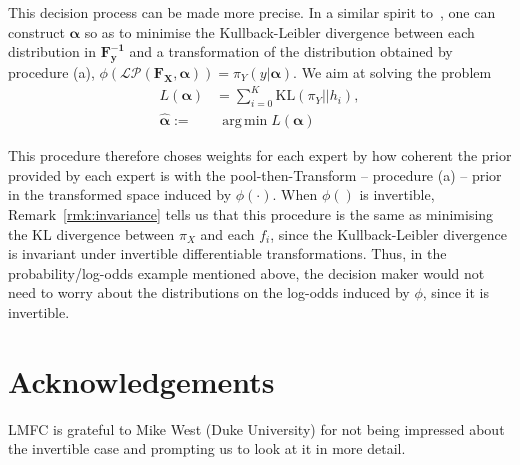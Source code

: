 \documentclass[a4paper, notitlepage, 10pt]{article}
\DeclareMathOperator*{\argmin}{arg\,min}
\begin{document}
This decision process can be made more precise.
In a similar spirit to~\cite{Carvalho2019}, one can construct $\boldsymbol\alpha$ so as to minimise the Kullback-Leibler divergence between each distribution in $\mathbf{F^{-1}_y}$ and a transformation of the distribution obtained by procedure (a), $ \phi(\mathcal{LP}(\mathbf{F_X}, \boldsymbol\alpha)) = \pi_{Y}(y | \boldsymbol\alpha)$.
We aim at solving the problem
\begin{align}
L(\boldsymbol\alpha) &= \sum_{i=0}^K \text{KL}(  \pi_{Y} || h_i), \\
     \hat{\boldsymbol\alpha}:=& \:\argmin L(\boldsymbol\alpha)  \nonumber
\end{align}

This procedure therefore choses weights for each expert by how coherent the prior provided by each expert is with the pool-then-Transform -- procedure (a) -- prior in the transformed space induced by $\phi(\cdot)$.
When $\phi()$ is invertible, Remark~\ref{rmk:invariance} tells us that this procedure is the same as minimising the KL divergence between $\pi_X$ and each $f_i$, since the Kullback-Leibler divergence is invariant under invertible differentiable transformations.
Thus, in the probability/log-odds example mentioned above, the decision maker would not need to worry about the distributions on the log-odds induced by $\phi$, since it is invertible.


\section*{Acknowledgements}

LMFC is grateful to Mike West (Duke University) for not being impressed about the invertible case and prompting us to look at it in more detail.


\end{document}
